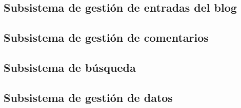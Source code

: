\subsection{Subsistema de gestión de entradas del blog}
\label{casos_uso_subsistema_blog}


\subsection{Subsistema de gestión de comentarios}
\label{casos_uso_subsistema_comentarios}


\subsection{Subsistema de búsqueda}
\label{casos_uso_subsistema_busqueda}


\subsection{Subsistema de gestión de datos}
\label{casos_uso_subsistema_datos}
